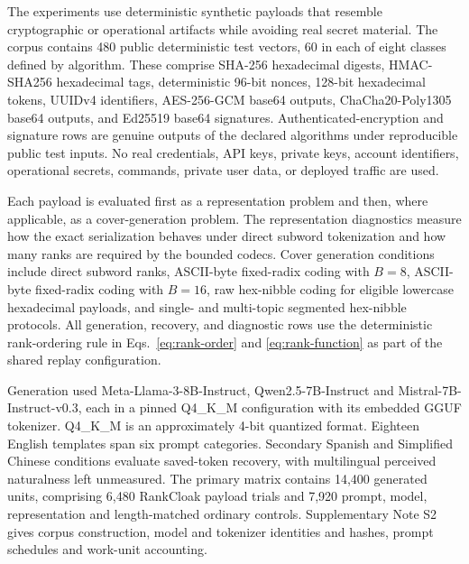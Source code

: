 \documentclass[fleqn,10pt]{wlscirep}
\begin{document}
The experiments use deterministic synthetic payloads that resemble cryptographic or operational artifacts while avoiding real secret material. The corpus contains 480 public deterministic test vectors, 60 in each of eight classes defined by algorithm. These comprise SHA-256 hexadecimal digests, HMAC-SHA256 hexadecimal tags, deterministic 96-bit nonces, 128-bit hexadecimal tokens, UUIDv4 identifiers, AES-256-GCM base64 outputs, ChaCha20-Poly1305 base64 outputs, and Ed25519 base64 signatures\cite{NIST2015SecureHashStandard,Krawczyk1997RFC2104,NIST2007GCM,NirLangley2018RFC8439,JosefssonLiusvaara2017RFC8032,Josefsson2006RFC4648,DavisPeabodyLeach2024RFC9562}. Authenticated-encryption and signature rows are genuine outputs of the declared algorithms under reproducible public test inputs. No real credentials, API keys, private keys, account identifiers, operational secrets, commands, private user data, or deployed traffic are used.

Each payload is evaluated first as a representation problem and then, where applicable, as a cover-generation problem. The representation diagnostics measure how the exact serialization behaves under direct subword tokenization and how many ranks are required by the bounded codecs. Cover generation conditions include direct subword ranks, ASCII-byte fixed-radix coding with \(B=8\), ASCII-byte fixed-radix coding with \(B=16\), raw hex-nibble coding for eligible lowercase hexadecimal payloads, and single- and multi-topic segmented hex-nibble protocols. All generation, recovery, and diagnostic rows use the deterministic rank-ordering rule in Eqs.~\eqref{eq:rank-order} and \eqref{eq:rank-function} as part of the shared replay configuration.

Generation used Meta-Llama-3-8B-Instruct, Qwen2.5-7B-Instruct and Mistral-7B-Instruct-v0.3, each in a pinned Q4\_K\_M configuration with its embedded GGUF tokenizer. Q4\_K\_M is an approximately 4-bit quantized format. Eighteen English templates span six prompt categories. Secondary Spanish and Simplified Chinese conditions evaluate saved-token recovery, with multilingual perceived naturalness left unmeasured. The primary matrix contains 14,400 generated units, comprising 6,480 RankCloak payload trials and 7,920 prompt, model, representation and length-matched ordinary controls. Supplementary Note S2 gives corpus construction, model and tokenizer identities and hashes, prompt schedules and work-unit accounting.
\end{document}
